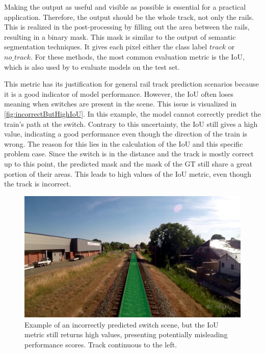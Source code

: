 Making the output as useful and visible as possible is essential for a practical application.
Therefore, the output should be the whole track, not only the rails.
This is realized in the post-processing by filling out the area between the rails, resulting in a binary mask.
This mask is similar to the output of semantic segmentation techniques.
It gives each pixel either the class label $track$ or $no\_track$.
For these methods, the most common evaluation metric is the \ac{IoU}, which is also used by \cite{tepNet2024} to evaluate models on the test set.

This metric has its justification for general rail track prediction scenarios because it is a good indicator of model performance.
However, the \ac{IoU} often loses meaning when switches are present in the scene.
This issue is visualized in \autoref{fig:incorrectButHighIoU}.
In this example, the model cannot correctly predict the train's path at the switch.
Contrary to this uncertainty, the \ac{IoU} still gives a high value, indicating a good performance even though the direction of the train is wrong.
The reason for this lies in the calculation of the \ac{IoU} and this specific problem case.
Since the switch is in the distance and the track is mostly correct up to this point, the predicted mask and the mask of the \ac{GT} still share a great portion of their areas.
This leads to high values of the \ac{IoU} metric, even though the track is incorrect.

\begin{figure} [H]
    \centering
    \includegraphics[width=0.7\linewidth]{PICs//usedDatasets/falsch_aber_hohe_IoU.jpg}
    \caption{Example of an incorrectly predicted switch scene, but the \ac{IoU} metric still returns high values, presenting potentially misleading performance scores. Track continuous to the left.}
    \label{fig:incorrectButHighIoU}
\end{figure}

